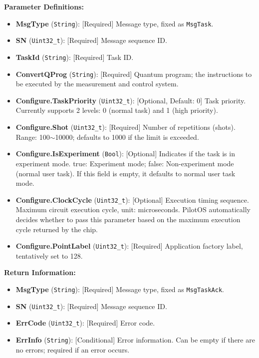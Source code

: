 \documentclass[12pt, a4paper]{article}
\begin{document}
\textbf{Parameter Definitions:}
\begin{itemize}
    \item \textbf{MsgType} (\texttt{String}): [Required] Message type, fixed as \texttt{MsgTask}.
    \item \textbf{SN} (\texttt{Uint32\_t}): [Required] Message sequence ID.
    \item \textbf{TaskId} (\texttt{String}): [Required] Task ID.
    \item \textbf{ConvertQProg} (\texttt{String}): [Required] Quantum program; the instructions to be executed by the measurement and control system.
    \item \textbf{Configure.TaskPriority} (\texttt{Uint32\_t}): [Optional, Default: 0] Task priority. Currently supports 2 levels: 0 (normal task) and 1 (high priority).
    \item \textbf{Configure.Shot} (\texttt{Uint32\_t}): [Required] Number of repetitions (shots). Range: 100$\sim$10000; defaults to 1000 if the limit is exceeded.
    \item \textbf{Configure.IsExperiment} (\texttt{Bool}): [Optional] Indicates if the task is in experiment mode. true: Experiment mode; false: Non-experiment mode (normal user task). If this field is empty, it defaults to normal user task mode.
    \item \textbf{Configure.ClockCycle} (\texttt{Uint32\_t}): [Optional] Execution timing sequence. Maximum circuit execution cycle, unit: microseconds. PilotOS automatically decides whether to pass this parameter based on the maximum execution cycle returned by the chip.
    \item \textbf{Configure.PointLabel} (\texttt{Uint32\_t}): [Required] Application factory label, tentatively set to 128.
\end{itemize}

\textbf{Return Information:}
\begin{itemize}
    \item \textbf{MsgType} (\texttt{String}): [Required] Message type, fixed as \texttt{MsgTaskAck}.
    \item \textbf{SN} (\texttt{Uint32\_t}): [Required] Message sequence ID.
    \item \textbf{ErrCode} (\texttt{Uint32\_t}): [Required] Error code.
    \item \textbf{ErrInfo} (\texttt{String}): [Conditional] Error information. Can be empty if there are no errors; required if an error occurs.
\end{itemize}
\end{document}
